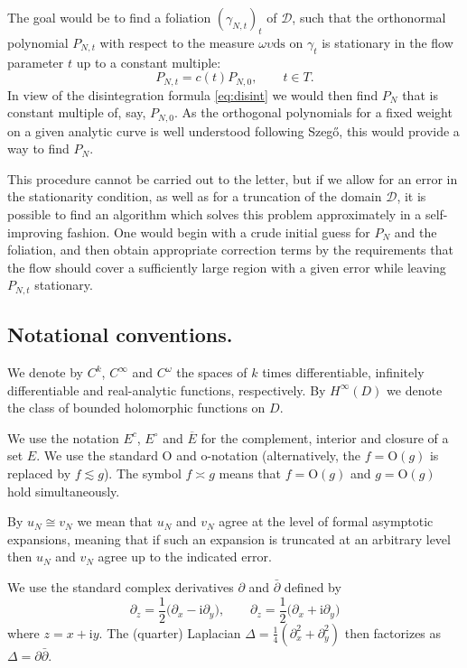 \documentclass{amsart}
\newcommand{\be}{\begin{equation}}
\newcommand{\ee}{\end{equation}}
\newcommand{\calD}{\mathcal{D}}
\newcommand{\diffs}{\mathrm{ds}}
\theoremstyle{definition}
\theoremstyle{remark}
\newcommand{\Ordo}{\mathrm{O}}
\newcommand{\ordo}{\mathrm{o}}
\newcommand{\imag}{\mathrm{i}}
\numberwithin{equation}{subsection}
\begin{document}
The goal would be to find a foliation $(\gamma_{N,t})_{t}$ 
of  $\calD$, such that
the orthonormal polynomial $P_{N,t}$
with respect to the measure $\omega\upsilon\diffs$ on  $\gamma_t$
is stationary in the flow parameter $t$ up to a constant multiple:
\be
P_{N,t}=c(t)P_{N,0},\qquad t\in T.
\ee
In view of the disintegration formula 
\eqref{eq:disint} we would then find $P_N$ that
is constant multiple of, say, 
$P_{N,0}$. As the orthogonal polynomials
for a fixed weight on a given analytic curve is well 
understood following Szeg\H{o}, 
this would provide a way to find $P_N$.

This procedure cannot be carried out to the letter, 
but if we allow for an error
in the stationarity condition, as well 
as for a truncation of the domain $\calD$,
it is possible to find an algorithm 
which solves this problem 
approximately in a self-improving fashion. 
One would begin with a crude initial guess 
for $P_N$ and the foliation,
and then obtain appropriate 
correction terms by the requirements 
that the flow should cover a sufficiently 
large region with a given error 
while leaving $P_{N,t}$ stationary.


\subsection{Notational conventions.}
\label{ss:notation}
We denote by $C^k$, $C^{\infty}$ and $C^\omega$ the spaces of
$k$ times differentiable, infinitely differentiable and 
real-analytic functions, respectively. By $H^\infty(D)$
we denote the class of bounded holomorphic functions on $D$.

We use the notation $E^c$, $E^\circ$ and $\overline{E}$ for the
complement, interior and closure of a set $E$.
We use the standard $\Ordo$ and $\ordo$-notation (alternatively,
the $f=\Ordo(g)$ is replaced by $f\lesssim g$). The symbol
$f\asymp g$ means that $f=\Ordo(g)$ and $g=\Ordo(g)$
hold simultaneously.

By $u_N\cong v_N$ we mean that $u_N$ and $v_N$
agree at the level of formal asymptotic expansions, meaning
that if such an expansion is truncated at an arbitrary level
then $u_N$ and $v_N$ agree up to the indicated error.

We use the standard complex derivatives 
$\partial$ and $\bar\partial$ defined by
\be
\partial_z=\frac12\big(\partial_x-\imag\partial_y\big),\qquad
\partial_z=\frac12\big(\partial_x+\imag\partial_y\big)
\ee
where $z=x+\imag y$. The (quarter)
Laplacian $\Delta=\frac14(\partial_x^2 + \partial_y^2)$ then factorizes as 
$\Delta=\partial\bar\partial$.
\end{document}
